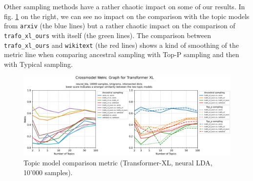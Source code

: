 Other sampling methods have a rather chaotic impact on some of our results. In fig. \ref{fig:Unigrams-10000-crossmodel-tt-trafo_xl-neural_lda-ab-is} on the right, we can see no impact on the comparison with the topic models from \texttt{arxiv} (the blue lines) but a rather chaotic impact on the comparison of \texttt{trafo\_xl\_ours} with itself (the green lines). The comparison between \texttt{trafo\_xl\_ours} and \texttt{wikitext} (the red lines) shows a kind of smoothing of the metric line when comparing ancestral sampling with Top-P sampling and then with Typical sampling. 
\begin{figure}[H]
    \centering
    \includegraphics[width=1\textwidth]{figures/Unigrams-10000-crossmodel-tt-trafo_xl-neural_lda-ab-is}
    \caption{Topic model comparison metric (Transformer-XL, neural LDA, 10'000 samples).}
    \label{fig:Unigrams-10000-crossmodel-tt-trafo_xl-neural_lda-ab-is}
\end{figure}
